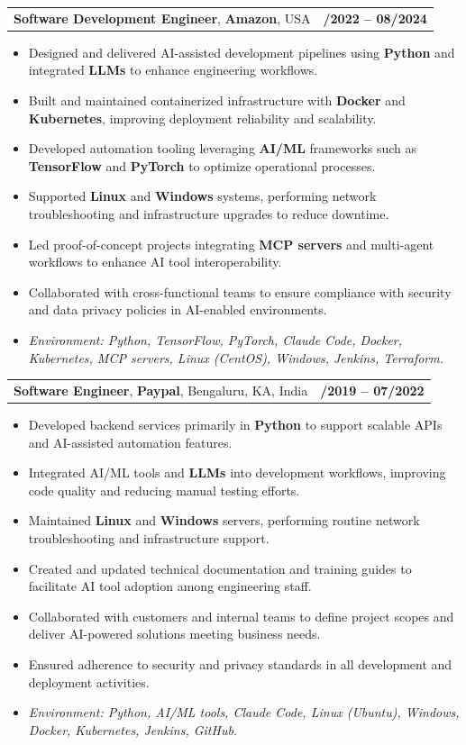 \documentclass[letterpaper,11pt]{article}
\makeatletter
\newcommand{\resumeItem}[1]{
  \item\footnotesize{
    {#1 \vspace{-2pt}}
  }
}
\newcommand{\resumeSubheading}[4]{
  \vspace{-2pt}\item
    \begin{tabular*}{1.0\textwidth}[t]{l@{\extracolsep{\fill}}r}
      \textbf{\fontsize{10pt}{14pt}\selectfont #3}, \textbf{\fontsize{10pt}{14pt}\selectfont #1}, \fontsize{10pt}{14pt}\selectfont #4 & \textbf{\fontsize{10pt}{14pt}\selectfont #2} \\
    \end{tabular*}\vspace{-7pt}
}
\newcommand{\resumeItemListStart}{\begin{itemize}[leftmargin=*]}
\newcommand{\resumeItemListEnd}{\end{itemize}\vspace{-5pt}}
\makeatother
\begin{document}
\resumeSubheading
{Amazon}{10/2022 -- 08/2024}
{Software Development Engineer}{USA}
\resumeItemListStart
  \resumeItem{Designed and delivered AI-assisted development pipelines using \textbf{Python} and integrated \textbf{LLMs} to enhance engineering workflows.}
  \resumeItem{Built and maintained containerized infrastructure with \textbf{Docker} and \textbf{Kubernetes}, improving deployment reliability and scalability.}
  \resumeItem{Developed automation tooling leveraging \textbf{AI/ML} frameworks such as \textbf{TensorFlow} and \textbf{PyTorch} to optimize operational processes.}
  \resumeItem{Supported \textbf{Linux} and \textbf{Windows} systems, performing network troubleshooting and infrastructure upgrades to reduce downtime.}
  \resumeItem{Led proof-of-concept projects integrating \textbf{MCP servers} and multi-agent workflows to enhance AI tool interoperability.}
  \resumeItem{Collaborated with cross-functional teams to ensure compliance with security and data privacy policies in AI-enabled environments.}
  \resumeItem{\textit{Environment: Python, TensorFlow, PyTorch, Claude Code, Docker, Kubernetes, MCP servers, Linux (CentOS), Windows, Jenkins, Terraform.}}
\resumeItemListEnd

\resumeSubheading
{Paypal}{08/2019 -- 07/2022}
{Software Engineer}{Bengaluru, KA, India}
\resumeItemListStart
  \resumeItem{Developed backend services primarily in \textbf{Python} to support scalable APIs and AI-assisted automation features.}
  \resumeItem{Integrated AI/ML tools and \textbf{LLMs} into development workflows, improving code quality and reducing manual testing efforts.}
  \resumeItem{Maintained \textbf{Linux} and \textbf{Windows} servers, performing routine network troubleshooting and infrastructure support.}
  \resumeItem{Created and updated technical documentation and training guides to facilitate AI tool adoption among engineering staff.}
  \resumeItem{Collaborated with customers and internal teams to define project scopes and deliver AI-powered solutions meeting business needs.}
  \resumeItem{Ensured adherence to security and privacy standards in all development and deployment activities.}
  \resumeItem{\textit{Environment: Python, AI/ML tools, Claude Code, Linux (Ubuntu), Windows, Docker, Kubernetes, Jenkins, GitHub.}}
\resumeItemListEnd
\end{document}
